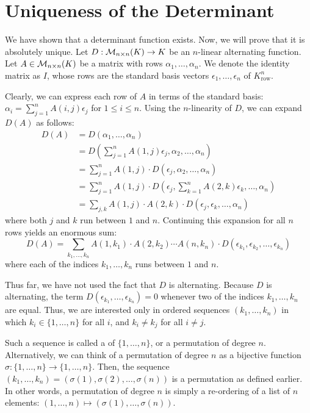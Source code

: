 \renewcommand{\thetheorem}{20.b.\arabic{theorem}}
\setcounter{theorem}{0}
\section{Uniqueness of the Determinant}

We have shown that a determinant function exists. Now, we will prove that it is absolutely unique. Let $D : \mathcal{M}_{n \times n}(K) \to K$ be an $n$-linear alternating function.
Let $A \in \mathcal{M}_{n \times n}(K)$ be a matrix with rows $\alpha_1, \dots, \alpha_n$. We denote the identity matrix as $I$, whose rows are the standard basis vectors $\epsilon_1, \dots, \epsilon_n$ of $K^n_{\text{row}}$.

Clearly, we can express each row of $A$ in terms of the standard basis: $\alpha_i = \sum_{j=1}^n A(i,j)\epsilon_j$ for $1 \le i \le n$. Using the $n$-linearity of $D$, we can expand $D(A)$ as follows:
\begin{align*}
  D(A) &= D(\alpha_1, \dots, \alpha_n) \\
  &= D\left(\sum_{j=1}^n A(1,j)\epsilon_j, \alpha_2, \dots, \alpha_n\right) \\
  &= \sum_{j=1}^n A(1,j) \cdot D(\epsilon_j, \alpha_2, \dots, \alpha_n) \\
  &= \sum_{j=1}^n A(1,j) \cdot D\left(\epsilon_j, \sum_{k=1}^n A(2,k)\epsilon_k, \dots, \alpha_n\right) \\
  &= \sum_{j,k} A(1,j) \cdot A(2,k) \cdot D(\epsilon_j, \epsilon_k, \dots, \alpha_n)
\end{align*}
where both $j$ and $k$ run between $1$ and $n$. Continuing this expansion for all $n$ rows yields an enormous sum:
\[
D(A) = \sum_{k_1, \dots, k_n} A(1,k_1) \cdot A(2,k_2) \cdots A(n,k_n) \cdot D(\epsilon_{k_1}, \epsilon_{k_2}, \dots, \epsilon_{k_n})
\]
where each of the indices $k_1, \dots, k_n$ runs between $1$ and $n$.

Thus far, we have not used the fact that $D$ is alternating. Because $D$ is alternating, the term $D(\epsilon_{k_1}, \dots, \epsilon_{k_n}) = 0$ whenever two of the indices $k_1, \dots, k_n$ are equal. Thus, we are interested only in ordered sequences $(k_1, \dots, k_n)$ in which $k_i \in \{1, \dots, n\}$ for all $i$, and $k_i \neq k_j$ for all $i \neq j$.

Such a sequence is called a  of $\{1, \dots, n\}$, or a permutation of degree $n$. Alternatively, we can think of a permutation of degree $n$ as a bijective function $\sigma : \{1, \dots, n\} \to \{1, \dots, n\}$. Then, the sequence $(k_1, \dots, k_n) = (\sigma(1), \sigma(2), \dots, \sigma(n))$ is a permutation as defined earlier. In other words, a permutation of degree $n$ is simply a re-ordering of a list of $n$ elements: $(1, \dots, n) \mapsto (\sigma(1), \dots, \sigma(n))$.

